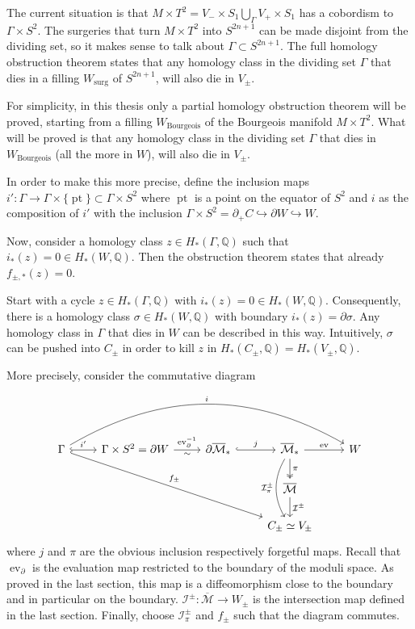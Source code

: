 The current situation is that $M\times T^2 = V_- \times S_1 \bigcup_\Gamma V_+\times S_1$ has a cobordism to $\Gamma \times S^2$.
The surgeries that turn $M\times T^2$ into $S^{2n+1}$ can be made disjoint from the dividing set, so it makes sense to talk about $\Gamma \subset S^{2n+1}$.
The full homology obstruction theorem states that any homology class in the dividing set $\Gamma$ that dies in a filling $W_\text{surg}$ of $S^{2n+1}$,
will also die in $V_\pm$.

For simplicity, in this thesis only a partial homology obstruction theorem will be proved, starting from a filling $W_\text{Bourgeois}$
of the Bourgeois manifold $M\times T^2$. What will be proved is that any homology class in the dividing set $\Gamma$ that dies in
$W_\text{Bourgeois}$ (all the more in $W$), will also die in $V_\pm$.

In order to make this more precise, define the inclusion maps
$i'\colon \Gamma \to \Gamma \times \{\operatorname{pt}\} \subset \Gamma \times S^2$ where $\operatorname{pt}$ is a point on the equator of $S^2$
and $i$ as the composition of $i'$ with the inclusion $\Gamma \times S^2 = \partial_+ C \hookrightarrow \partial W \hookrightarrow W$. 

Now, consider a homology class $z \in H_*(\Gamma, \mathbb{Q})$ such that $i_*(z) = 0 \in H_*(W, \mathbb{Q})$.
Then the obstruction theorem states that already $f_{\pm,*}(z) = 0$.


Start with a cycle $z \in H_*(\Gamma, \mathbb Q)$ with $i_*(z) = 0 \in H_*(W, \mathbb{Q})$.
Consequently, there is a homology class $\sigma \in H_*(W, \mathbb Q)$ with boundary $i_*(z) = \partial \sigma$.
Any homology class in $\Gamma$ that dies in $W$ can be described in this way.
Intuitively, $\sigma$ can be pushed into $C_\pm$ in order to kill $z$ in $H_*(C_\pm, \mathbb{Q}) = H_*(V_\pm, \mathbb{Q})$.

More precisely, consider the commutative diagram
\[
\begin{tikzcd}
    \Gamma \arrow[r, hook, "i'"] \arrow[rrrr, bend left, "i"] \arrow[rrrdd, hook, "f_\pm"]
        & \Gamma \times S^2  = \partial W  \arrow[r, "\operatorname{ev}_\partial^{-1}", "\sim" below]
        & \partial \overline{\mathcal M}_* \arrow[r, hook, "j"]
        & \overline{\mathcal M}_*          \arrow[r, "\operatorname{ev}"] \arrow[d, twoheadrightarrow, "\pi"] \arrow[dd, bend right, "\mathcal I_\pi^\pm" left]
        & W \\
    &&& \overline{\mathcal M} \arrow[d, "\mathcal{I}^\pm"]  &   \\
    &&& C_\pm \simeq V_\pm                                  &   
\end{tikzcd}
\]
where $j$ and $\pi$ are the obvious inclusion respectively forgetful maps.
Recall that $\operatorname{ev}_\partial$ is the evaluation map restricted to the boundary of the moduli space. 
As proved in the last section, this map is a diffeomorphism close to the boundary and in particular on the boundary.
$\mathcal{I}^\pm\colon \overline{\mathcal{M}} \to W_\pm$ is the intersection map defined in the last section.
Finally, choose $\mathcal I_\pi^\pm$ and $f_\pm$ such that the diagram commutes.

